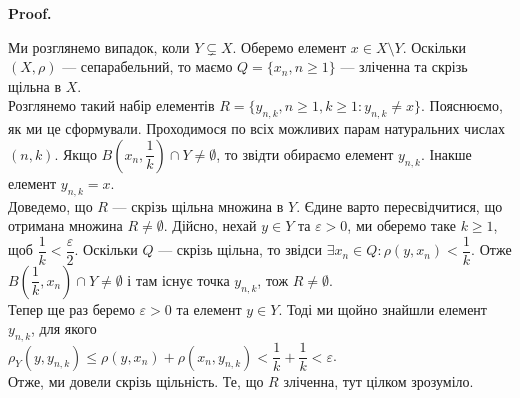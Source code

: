 \documentclass[a4paper, 10pt]{article}
\makeatletter
\theoremstyle{theoremdd}
\theoremstyle{theoremdd}
\theoremstyle{theoremdd}
\theoremstyle{theoremdd}
\theoremstyle{theoremdd}
\theoremstyle{theoremdd}
\theoremstyle{theoremdd}
\theoremstyle{theoremdd}
\renewenvironment{proof}[1][Proof.\\]{\par
\pushQED{\hfill \qed}%
\normalfont \topsep6\p@\@plus6\p@\relax
\trivlist
\item\relax
{\bfseries
#1\@addpunct{.}}\hspace\labelsep\ignorespaces
}{%
\popQED\endtrivlist\@endpefalse
}
\makeatother
\begin{document}
\begin{proof}
Ми розглянемо випадок, коли $Y \subsetneq X$. Оберемо елемент $x \in X \setminus Y$. Оскільки $(X,\rho)$ --- сепарабельний, то маємо $Q = \{x_n, n \geq 1\}$ --- зліченна та скрізь щільна в $X$.\\
Розглянемо такий набір елементів $R = \{y_{n,k}, n \geq 1, k \geq 1: y_{n,k} \neq x\}$. Пояснюємо, як ми це сформували. Проходимося по всіх можливих парам натуральних числах $(n,k)$. Якщо $B\left(  x_n, \dfrac{1}{k} \right) \cap Y \neq \emptyset$, то звідти обираємо елемент $y_{n,k}$. Інакше елемент $y_{n,k} = x$.\\
Доведемо, що $R$ --- скрізь щільна множина в $Y$. Єдине варто пересвідчитися, що отримана множина $R \neq \emptyset$. Дійсно, нехай $y \in Y$ та $\varepsilon > 0$, ми оберемо таке $k \geq 1$, щоб $\dfrac{1}{k} < \dfrac{\varepsilon}{2}$. Оскільки $Q$ --- скрізь щільна, то звідси $\exists x_n \in Q: \rho(y,x_n) < \dfrac{1}{k}$. Отже $B\left( \dfrac{1}{k},x_n \right) \cap Y \neq \emptyset$ і там існує точка $y_{n,k}$, тож $R \neq \emptyset$.\\
Тепер ще раз беремо $\varepsilon > 0$ та елемент $y \in Y$. Тоді ми щойно знайшли елемент $y_{n,k}$, для якого\\
$\rho_Y(y,y_{n,k}) \leq \rho(y,x_n) + \rho(x_n,y_{n,k}) < \dfrac{1}{k} + \dfrac{1}{k} < \varepsilon$.\\
Отже, ми довели скрізь щільність. Те, що $R$ зліченна, тут цілком зрозуміло.
\end{proof}
\end{document}
